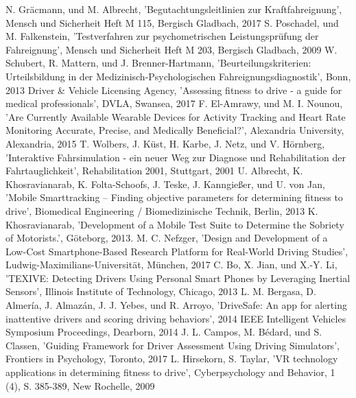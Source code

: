 \documentclass[conference]{IEEEtran}
\begin{document}
\begin{thebibliography}{00}

 N. Gräcmann, und M. Albrecht, 'Begutachtungsleitlinien zur Kraftfahreignung', Mensch und Sicherheit Heft M 115, Bergisch Gladbach, 2017
 S. Poschadel, und M. Falkenstein, 'Testverfahren zur psychometrischen Leistungsprüfung der Fahreignung', Mensch und Sicherheit Heft M 203, Bergisch Gladbach, 2009
 W. Schubert, R. Mattern, und J. Brenner-Hartmann, 'Beurteilungskriterien: Urteilsbildung in der Medizinisch-Psychologischen Fahreignungsdiagnostik', Bonn, 2013
 Driver \& Vehicle Licensing Agency, 'Assessing fitness to drive - a guide for medical professionals', DVLA, Swansea, 2017
 F. El-Amrawy, und M. I. Nounou, 'Are Currently Available Wearable Devices for Activity Tracking and Heart Rate Monitoring Accurate, Precise, and Medically Beneficial?', Alexandria University, Alexandria, 2015
 T. Wolbers, J. Küst, H. Karbe, J. Netz, und V. Hörnberg, 'Interaktive Fahrsimulation - ein neuer Weg zur Diagnose und Rehabilitation der Fahrtauglichkeit', Rehabilitation 2001, Stuttgart, 2001
 U. Albrecht, K. Khosravianarab, K. Folta-Schoofs, J. Teske, J. Kanngießer, und U. von Jan, 'Mobile Smarttracking – Finding objective parameters for determining fitness to drive', Biomedical Engineering / Biomedizinische Technik, Berlin, 2013
K. Khosravianarab, 'Development of a Mobile Test Suite to Determine the Sobriety of Motorists.', Göteborg, 2013.
 M. C. Nefzger, 'Design and Development of a Low-Cost Smartphone-Based Research Platform for Real-World Driving Studies', Ludwig-Maximilians-Universität, München, 2017
 C. Bo, X. Jian, und X.-Y. Li, 'TEXIVE: Detecting Drivers Using Personal Smart Phones
by Leveraging Inertial Sensors',  Illinois Institute of Technology, Chicago, 2013
 L. M. Bergasa, D. Almería, J. Almazán, J. J. Yebes, und R. Arroyo, 'DriveSafe: An app for alerting inattentive drivers and scoring driving behaviors', 2014 IEEE Intelligent Vehicles Symposium Proceedings, Dearborn, 2014
J. L. Campos, M. Bédard, und S. Classen, 'Guiding Framework for Driver Assessment Using Driving Simulators', Frontiers in Psychology, Toronto, 2017
L. Hirsekorn, S. Taylar, 'VR technology applications in determining fitness to drive', Cyberpsychology and Behavior, 1 (4), S. 385-389, New Rochelle, 2009

\end{thebibliography}
\end{document}

